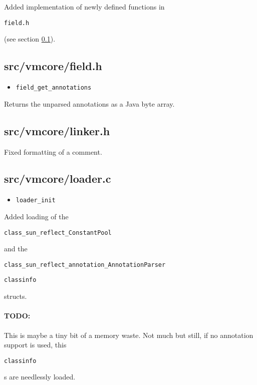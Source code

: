 \documentclass[a4paper, 10pt, titlepage]{scrartcl} %
\begin{document}
Added implementation of newly defined functions in \begin{scriptsize}\verb|field|\hspace{0.0pt}\verb|.|\hspace{0.0pt}\verb|h|\end{scriptsize} (see section \ref{sec:src/vmcore/field.h}).

\subsection{src/vmcore/field.h}
\label{sec:src/vmcore/field.h}

\begin{itemize}
 \item \begin{scriptsize}\verb|field_get_annotations|\end{scriptsize}
\end{itemize}
Returns the unparsed annotations as a Java byte array.

\subsection{src/vmcore/linker.h}
\label{sec:src/vmcore/linker.h}

Fixed formatting of a comment.

\subsection{src/vmcore/loader.c}
\label{sec:src/vmcore/loader.c}

\begin{itemize}
 \item \begin{scriptsize}\verb|loader_init|\end{scriptsize}
\end{itemize}
Added loading of the \begin{scriptsize}\verb|class_sun_reflect_ConstantPool|\end{scriptsize} and the
\begin{scriptsize}\verb|class_sun_reflect_annotation_AnnotationParser|\end{scriptsize} \begin{scriptsize}\verb|classinfo|\end{scriptsize} structs.

\paragraph{TODO:}
\label{par:TODO/dont-load-extra-classinfos}This is maybe a tiny bit of a memory waste. Not much but still, if no
annotation support is used, this \begin{scriptsize}\verb|classinfo|\end{scriptsize}s are needlessly loaded.
\end{document}

